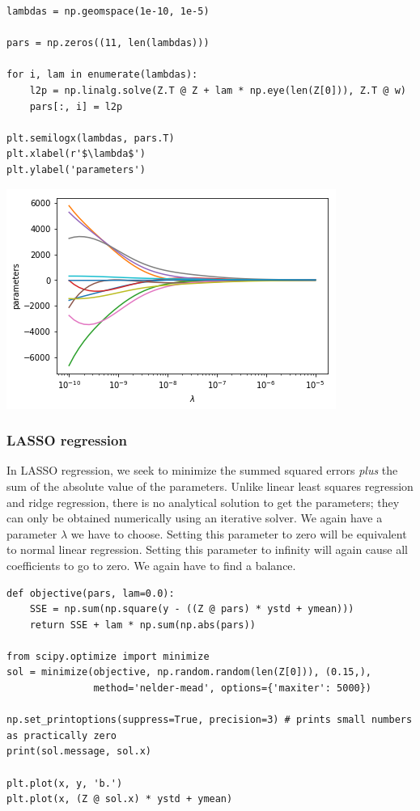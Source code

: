 \documentclass[11pt]{article}
\begin{document}
\begin{verbatim}
lambdas = np.geomspace(1e-10, 1e-5)

pars = np.zeros((11, len(lambdas)))

for i, lam in enumerate(lambdas):
    l2p = np.linalg.solve(Z.T @ Z + lam * np.eye(len(Z[0])), Z.T @ w)
    pars[:, i] = l2p

plt.semilogx(lambdas, pars.T)
plt.xlabel(r'$\lambda$')
plt.ylabel('parameters')
\end{verbatim}

\begin{center}
\includegraphics[width=.9\linewidth]{obipy-resources/d00b1703e45a1bb2f86b06f32bba01b8-19673qw1.png}
\end{center}

\subsubsection{LASSO regression}
\label{sec:org2a1520e}

In LASSO regression, we seek to minimize the summed squared errors \emph{plus} the sum of the absolute value of the parameters. Unlike linear least squares regression and ridge regression, there is no analytical solution to get the parameters; they can only be obtained numerically using an iterative solver. We again have a parameter \(\lambda\) we have to choose. Setting this parameter to zero will be equivalent to normal linear regression. Setting this parameter to infinity will again cause all coefficients to go to zero. We again have to find a balance.

\begin{verbatim}
def objective(pars, lam=0.0):
    SSE = np.sum(np.square(y - ((Z @ pars) * ystd + ymean)))
    return SSE + lam * np.sum(np.abs(pars))

from scipy.optimize import minimize
sol = minimize(objective, np.random.random(len(Z[0])), (0.15,),
               method='nelder-mead', options={'maxiter': 5000})

np.set_printoptions(suppress=True, precision=3) # prints small numbers as practically zero
print(sol.message, sol.x)

plt.plot(x, y, 'b.')
plt.plot(x, (Z @ sol.x) * ystd + ymean)
\end{verbatim}
\end{document}

